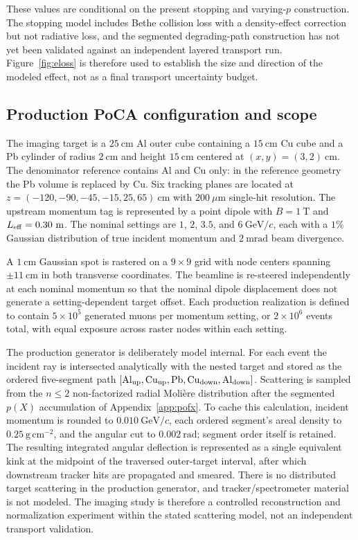 \documentclass[aps,pra,reprint,longbibliography,floatfix]{revtex4-2}
\begin{document}
These values are conditional on the present stopping and varying-$p$ construction.  The stopping model includes Bethe collision loss with a density-effect correction but not radiative loss, and the segmented degrading-path construction has not yet been validated against an independent layered transport run.  Figure~\ref{fig:eloss} is therefore used to establish the size and direction of the modeled effect, not as a final transport uncertainty budget.

\subsection{Production PoCA configuration and scope}\label{sec:simsetup}
The imaging target is a $25~\mathrm{cm}$ Al outer cube containing a $15~\mathrm{cm}$ Cu cube and a Pb cylinder of radius $2~\mathrm{cm}$ and height $15~\mathrm{cm}$ centered at $(x,y)=(3,2)~\mathrm{cm}$.  The denominator reference contains Al and Cu only: in the reference geometry the Pb volume is replaced by Cu.  Six tracking planes are located at $z=(-120,-90,-45,-15,25,65)~\mathrm{cm}$ with $200~\mu\mathrm{m}$ single-hit resolution.  The upstream momentum tag is represented by a point dipole with $B=1~\mathrm{T}$ and $L_{\rm eff}=0.30~\mathrm{m}$.  The nominal settings are $1$, $2$, $3.5$, and $6~\mathrm{GeV}/c$, each with a $1\%$ Gaussian distribution of true incident momentum and $2~\mathrm{mrad}$ beam divergence.

A $1~\mathrm{cm}$ Gaussian spot is rastered on a $9\times9$ grid with node centers spanning $\pm11~\mathrm{cm}$ in both transverse coordinates.  The beamline is re-steered independently at each nominal momentum so that the nominal dipole displacement does not generate a setting-dependent target offset.  Each production realization is defined to contain $5\times10^5$ generated muons per momentum setting, or $2\times10^6$ events total, with equal exposure across raster nodes within each setting.

The production generator is deliberately model internal.  For each event the incident ray is intersected analytically with the nested target and stored as the ordered five-segment path $[\mathrm{Al}_{\rm up},\mathrm{Cu}_{\rm up},\mathrm{Pb},\mathrm{Cu}_{\rm down},\mathrm{Al}_{\rm down}]$.  Scattering is sampled from the $n\le2$ non-factorized radial Moli\`ere distribution after the segmented $p(X)$ accumulation of Appendix~\ref{app:pofx}.  To cache this calculation, incident momentum is rounded to $0.010~\mathrm{GeV}/c$, each ordered segment's areal density to $0.25~\mathrm{g\,cm^{-2}}$, and the angular cut to $0.002~\mathrm{rad}$; segment order itself is retained.  The resulting integrated angular deflection is represented as a single equivalent kink at the midpoint of the traversed outer-target interval, after which downstream tracker hits are propagated and smeared.  There is no distributed target scattering in the production generator, and tracker/spectrometer material is not modeled.  The imaging study is therefore a controlled reconstruction and normalization experiment within the stated scattering model, not an independent transport validation.
\end{document}
